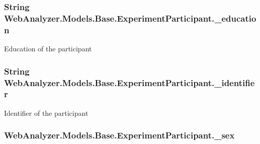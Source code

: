 \subsubsection[{\+\_\+education}]{\setlength{\rightskip}{0pt plus 5cm}String Web\+Analyzer.\+Models.\+Base.\+Experiment\+Participant.\+\_\+education\hspace{0.3cm}{\ttfamily [private]}}\label{class_web_analyzer_1_1_models_1_1_base_1_1_experiment_participant_ad23c640c3cbaef32fff1f457dd1f6031}


Education of the participant 

\hypertarget{class_web_analyzer_1_1_models_1_1_base_1_1_experiment_participant_a78f7ef6a042a9c3b2b35618931706ee6}{}
\subsubsection[{\+\_\+identifier}]{\setlength{\rightskip}{0pt plus 5cm}String Web\+Analyzer.\+Models.\+Base.\+Experiment\+Participant.\+\_\+identifier\hspace{0.3cm}{\ttfamily [private]}}\label{class_web_analyzer_1_1_models_1_1_base_1_1_experiment_participant_a78f7ef6a042a9c3b2b35618931706ee6}


Identifier of the participant 

\hypertarget{class_web_analyzer_1_1_models_1_1_base_1_1_experiment_participant_a429b36341a5a5c2a52e50c5f96afa69d}{}
\subsubsection[{\+\_\+sex}]{ Web\+Analyzer.\+Models.\+Base.\+Experiment\+Participant.\+\_\+sex\hspace{0.3cm}{\ttfamily [private]}}\label{class_web_analyzer_1_1_models_1_1_base_1_1_experiment_participant_a429b36341a5a5c2a52e50c5f96afa69d}


